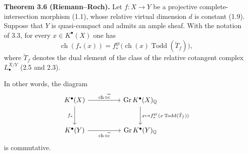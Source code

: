 \documentclass[11pt]{article}
\newcommand{\Gr}{\operatorname{Gr}}
\newcommand{\ch}{\operatorname{ch}}
\newcommand{\Todd}{\operatorname{Todd}}
\providecommand{\ch}{\operatorname{ch}}
\providecommand{\Todd}{\operatorname{Todd}}
\providecommand{\Gr}{\operatorname{Gr}}
\providecommand{\Gr}{\operatorname{G}}
\begin{document}
\textbf{Theorem 3.6 (Riemann--Roch).} Let $f:X\to Y$ be a projective complete-intersection morphism (1.1), whose relative virtual dimension $d$ is constant (1.9). Suppose that $Y$ is quasi-compact and admits an ample sheaf. With the notation of 3.3, for every $x\in K^{\bullet}(X)$ one has
\[
\ch(f_*(x))=f^{\mathrm{gr}}_*\bigl(\ch(x)\Todd(\check T_f)\bigr),
\]
where $\check T_f$ denotes the dual element of the class of the relative cotangent complex $L^{X/Y}_\bullet$ (2.5 and 2.3).

In other words, the diagram
\[
\begin{tikzcd}[column sep=huge,row sep=large]
K^{\bullet}(X) \arrow[r,"\ch\circ\widetilde c"] \arrow[d,"f_*"'] & \Gr K^{\bullet}(X)_{\mathbb Q} \arrow[d,"x\mapsto f^{\mathrm{gr}}_*(x\Todd(\check T_f))"]\\
K^{\bullet}(Y) \arrow[r,"\ch\circ\widetilde c"'] & \Gr K^{\bullet}(Y)_{\mathbb Q}
\end{tikzcd}
\]
is commutative.
\end{document}
